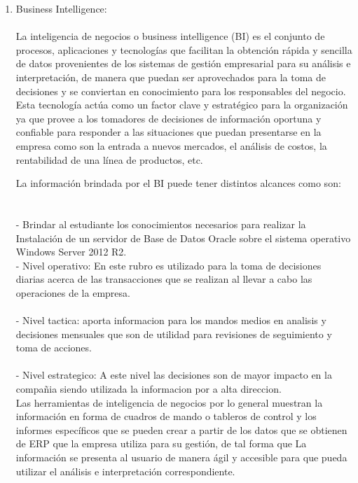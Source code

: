 \begin{enumerate}[2.]
	\item Business Intelligence:
\\
\\
La inteligencia de negocios o business intelligence (BI) es el conjunto de procesos, aplicaciones y tecnologías que facilitan la obtención rápida y sencilla de datos provenientes de los sistemas de gestión empresarial para su análisis e interpretación, de manera que puedan ser aprovechados para la toma de decisiones y se conviertan en conocimiento para los responsables del negocio.
Esta tecnología actúa como un factor clave y estratégico para la organización ya que provee a los tomadores de decisiones de información oportuna y confiable para responder a las situaciones que puedan presentarse en la empresa como son la entrada a nuevos mercados, el análisis de costos, la rentabilidad de una línea de productos, etc.

La información brindada por el BI puede tener distintos alcances como son:
\\
\\\\- Brindar al estudiante los conocimientos necesarios para realizar la Instalación de un servidor de Base de Datos Oracle sobre el sistema operativo Windows Server 2012 R2.
	\\- Nivel operativo: En este rubro es utilizado para la toma de decisiones diarias acerca de las transacciones que se realizan al llevar a cabo las operaciones de la empresa.\\
	\\- Nivel tactica: aporta informacion para los mandos medios en analisis y decisiones mensuales que son de utilidad para revisiones de seguimiento y toma de acciones.\\
	\\- Nivel estrategico: A este nivel las decisiones son de mayor impacto en la compañia siendo utilizada la informacion por a alta direccion.\\


Las herramientas de inteligencia de negocios por lo general muestran la información en forma de cuadros de mando o  tableros de control y los informes específicos que se pueden crear a partir de los datos que se obtienen de ERP que la empresa utiliza para su gestión, de tal forma que La información se presenta al usuario de manera ágil y accesible para que pueda utilizar el análisis e interpretación correspondiente.


\end{enumerate}
